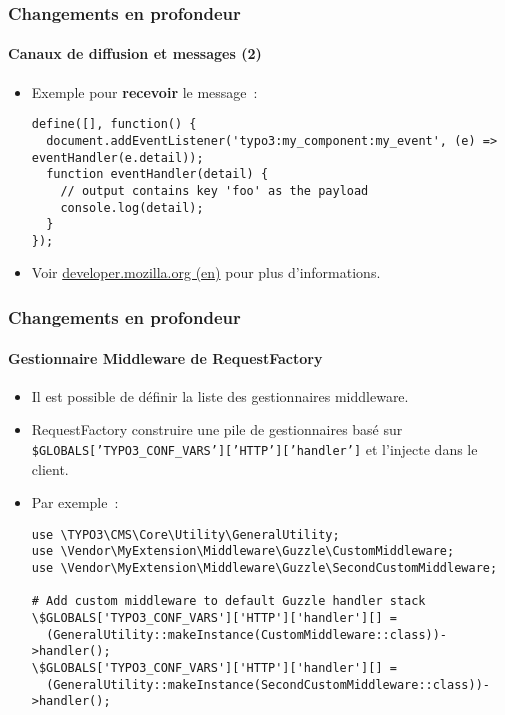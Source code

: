 
\begin{frame}[fragile]
	\frametitle{Changements en profondeur}
	\framesubtitle{Canaux de diffusion et messages (2)}

	\lstset{basicstyle=\tiny\ttfamily}

	\begin{itemize}
		\item Exemple pour \textbf{recevoir} le message~:
\begin{lstlisting}
define([], function() {
  document.addEventListener('typo3:my_component:my_event', (e) => eventHandler(e.detail));
  function eventHandler(detail) {
    // output contains key 'foo' as the payload
    console.log(detail);
  }
});
\end{lstlisting}

		\item Voir \href{https://developer.mozilla.org/en-US/docs/Web/API/Broadcast_Channel_API}{developer.mozilla.org (en)}
			pour plus d'informations.

	\end{itemize}

\end{frame}


\begin{frame}[fragile]
	\frametitle{Changements en profondeur}
	\framesubtitle{Gestionnaire Middleware de RequestFactory}

	\lstset{basicstyle=\tiny\ttfamily}

	\begin{itemize}
		\item Il est possible de définir la liste des gestionnaires middleware.
		\item RequestFactory construire une pile de gestionnaires basé sur\newline
			\small
				\texttt{\$GLOBALS['TYPO3\_CONF\_VARS']['HTTP']['handler']}
			\normalsize
			et l'injecte dans le client.
		\item Par exemple~:
\begin{lstlisting}
use \TYPO3\CMS\Core\Utility\GeneralUtility;
use \Vendor\MyExtension\Middleware\Guzzle\CustomMiddleware;
use \Vendor\MyExtension\Middleware\Guzzle\SecondCustomMiddleware;

# Add custom middleware to default Guzzle handler stack
\$GLOBALS['TYPO3_CONF_VARS']['HTTP']['handler'][] =
  (GeneralUtility::makeInstance(CustomMiddleware::class))->handler();
\$GLOBALS['TYPO3_CONF_VARS']['HTTP']['handler'][] =
  (GeneralUtility::makeInstance(SecondCustomMiddleware::class))->handler();
\end{lstlisting}

	\end{itemize}

\end{frame}

